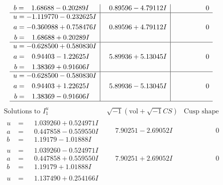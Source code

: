 \documentclass[1p]{elsarticle_modified}
\theoremstyle{definition}
\newcommand{\I}{\sqrt{-1}}
\begin{document}
$$\begin{array}{c|c|c}
\begin{aligned}
b &= \phantom{-}1.68688 - 0.20289 I\end{aligned}
 & \phantom{-}0.89596 - 4.79112 I & \phantom{-0.000000 } 0 \\ \hline\begin{aligned}
u &= -1.119770 - 0.232625 I \\
a &= -0.360988 + 0.758476 I \\
b &= \phantom{-}1.68688 + 0.20289 I\end{aligned}
 & \phantom{-}0.89596 + 4.79112 I & \phantom{-0.000000 } 0 \\ \hline\begin{aligned}
u &= -0.628500 + 0.580830 I \\
a &= \phantom{-}0.94403 - 1.22625 I \\
b &= \phantom{-}1.38369 + 0.91606 I\end{aligned}
 & \phantom{-}5.89936 + 5.13045 I & \phantom{-0.000000 } 0 \\ \hline\begin{aligned}
u &= -0.628500 - 0.580830 I \\
a &= \phantom{-}0.94403 + 1.22625 I \\
b &= \phantom{-}1.38369 - 0.91606 I\end{aligned}
 & \phantom{-}5.89936 - 5.13045 I & \phantom{-0.000000 } 0\\
 \hline 
 \end{array}$$\newpage$$\begin{array}{c|c|c}  
\text{Solutions to }I^u_{1}& \I (\text{vol} + \sqrt{-1}CS) & \text{Cusp shape}\\
 \hline 
\begin{aligned}
u &= \phantom{-}1.039260 + 0.524971 I \\
a &= \phantom{-}0.447858 - 0.559550 I \\
b &= \phantom{-}1.19179 - 1.01888 I\end{aligned}
 & \phantom{-}7.90251 - 2.69052 I & \phantom{-0.000000 } 0 \\ \hline\begin{aligned}
u &= \phantom{-}1.039260 - 0.524971 I \\
a &= \phantom{-}0.447858 + 0.559550 I \\
b &= \phantom{-}1.19179 + 1.01888 I\end{aligned}
 & \phantom{-}7.90251 + 2.69052 I & \phantom{-0.000000 } 0 \\ \hline\begin{aligned}
u &= \phantom{-}1.137490 + 0.254166 I \\

\end{aligned}
\end{array}$$
\end{document}
